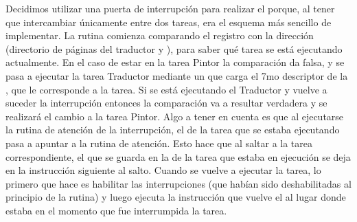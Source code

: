 Decidimos utilizar una puerta de interrupción para realizar el  porque, al tener que intercambiar únicamente entre dos tareas, era el
esquema más sencillo de implementar. La rutina comienza comparando el registro  con la dirección  (directorio de páginas del traductor 
y ), para saber qué tarea se está ejecutando actualmente. En el caso de estar en la tarea Pintor la comparación da falsa, y se pasa a 
ejecutar la tarea Traductor mediante un  que carga el 7mo descriptor de la , que le corresponde a la tarea. Si se está ejecutando el 
Traductor y vuelve a suceder la interrupción entonces la comparación va a resultar verdadera y se realizará el cambio a la tarea Pintor. Algo a tener en cuenta
es que al ejecutarse la rutina de atención de la interrupción, el  de la tarea que se estaba ejecutando pasa a apuntar a la rutina de atención. Esto
hace que al saltar a la tarea correspondiente, el  que se guarda en la  de la tarea que estaba en ejecución se deja en la instrucción siguiente
al salto. Cuando se vuelve a ejecutar la tarea, lo primero que hace es habilitar las interrupciones (que habían sido deshabilitadas al principio de la rutina) 
y luego ejecuta la instrucción  que vuelve el  al lugar donde estaba en el momento que fue interrumpida la tarea.


